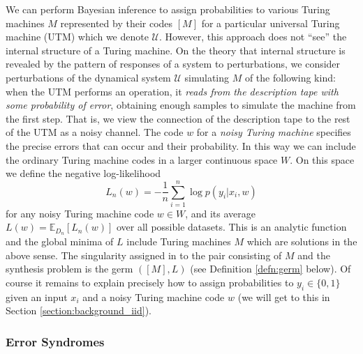 \documentclass[english,letter paper,12pt,reqno]{article}
\theoremstyle{definition}
\begin{document}
We can perform Bayesian inference to assign probabilities to various Turing machines $M$ represented by their codes $[M]$ for a particular universal Turing machine (UTM) which we denote $\mathcal{U}$. However, this approach does not ``see'' the internal structure of a Turing machine. On the theory that internal structure is revealed by the pattern of responses of a system to perturbations, we consider perturbations of the dynamical system $\mathcal{U}$ simulating $M$ of the following kind: when the UTM performs an operation, it \emph{reads from the description tape with some probability of error}, obtaining enough samples to simulate the machine from the first step. That is, we view the connection of the description tape to the rest of the UTM as a noisy channel. The code $w$ for a \emph{noisy Turing machine} specifies the precise errors that can occur and their probability. In this way we can include the ordinary Turing machine codes in a larger continuous space $W$. On this space we define the negative log-likelihood
\begin{equation}
L_n(w) = - \frac{1}{n} \sum_{i=1}^n \log p(y_i|x_i,w)
\end{equation}
for any noisy Turing machine code $w \in W$, and its average $L(w) = \mathbb{E}_{D_n}[ L_n(w) ]$ over all possible datasets. This is an analytic function and the global minima of $L$ include Turing machines $M$ which are solutions in the above sense. The singularity assigned in \cite{clift2021geometry,waring2021geometric} to the pair consisting of $M$ and the synthesis problem is the germ $([M], L)$ (see Definition \ref{defn:germ} below). Of course it remains to explain precisely how to assign probabilities to $y_i \in \{0,1\}$ given an input $x_i$ and a noisy Turing machine code $w$ (we will get to this in Section \ref{section:background_iid}).

\subsubsection{Error Syndromes}
\end{document}
